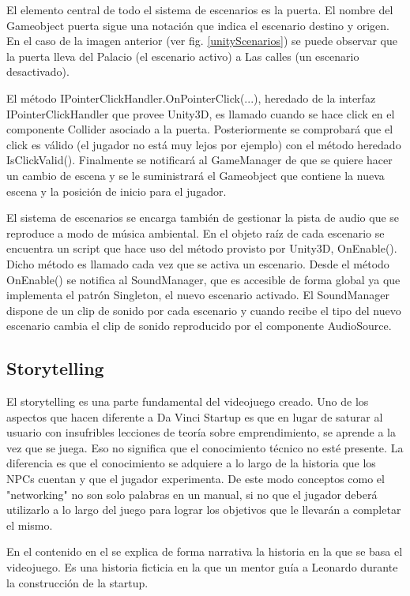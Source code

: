El elemento central de todo el sistema de escenarios es la puerta. El nombre del Gameobject puerta sigue una notación que indica el escenario destino y origen. En el caso de la imagen anterior (ver fig. \ref{unityScenarios}) se puede observar que la puerta lleva del Palacio (el escenario activo) a Las calles (un escenario desactivado).

El método IPointerClickHandler.OnPointerClick(...), heredado de la interfaz IPointerClickHandler que provee Unity3D, es llamado cuando se hace click en el componente Collider asociado a la puerta. Posteriormente se comprobará que el click es válido (el jugador no está muy lejos por ejemplo) con el método heredado IsClickValid(). Finalmente se notificará al GameManager de que se quiere hacer un cambio de escena y se le suministrará el Gameobject que contiene la nueva escena y la posición de inicio para el jugador.

El sistema de escenarios se encarga también de gestionar la pista de audio que se reproduce a modo de música ambiental. En el objeto raíz de cada escenario se encuentra un script que hace uso del método provisto por Unity3D, OnEnable(). Dicho método es llamado cada vez que se activa un escenario. Desde el método OnEnable() se notifica al SoundManager, que es accesible de forma global ya que implementa el patrón Singleton, el nuevo escenario activado. El SoundManager dispone de un clip de sonido por cada escenario y cuando recibe el tipo del nuevo escenario cambia el clip de sonido reproducido por el componente AudioSource.

\subsection{Storytelling}

El storytelling es una parte fundamental del videojuego creado. Uno de los aspectos que hacen diferente a Da Vinci Startup es que en lugar de saturar al usuario con insufribles lecciones de teoría sobre emprendimiento, se aprende a la vez que se juega. Eso no significa que el conocimiento técnico no esté presente. La diferencia es que el conocimiento se adquiere a lo largo de la historia que los NPCs cuentan y que el jugador experimenta. De este modo conceptos como el "networking" no son solo palabras en un manual, si no que el jugador deberá utilizarlo a lo largo del juego para lograr los objetivos que le llevarán a completar el mismo.


En el  contenido en el  se explica de forma narrativa la historia en la que se basa el videojuego. Es una historia ficticia en la que un mentor guía a Leonardo durante la construcción de la startup.

